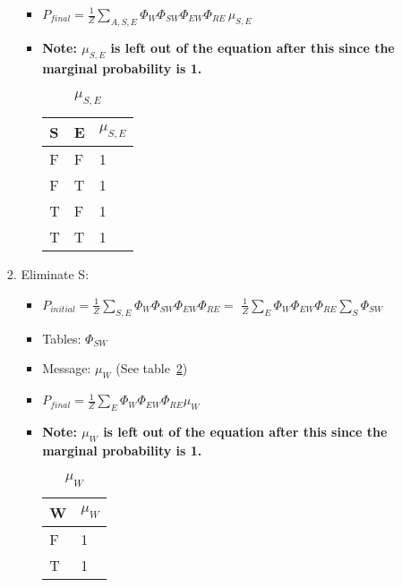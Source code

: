 \documentclass{article}
\begin{document}
\begin{enumerate}[label=(\alph*)]
\begin{enumerate}[label=\roman*.]
\begin{enumerate}[label=\alph*.]
\begin{itemize}
\item $P_{final}=\frac{1}{Z}\sum_{A,S,E}\Phi_{W}\Phi_{SW}\Phi_{EW}\Phi_{RE}\,\mu_{S,E}$ 

\item \textbf{Note:  $\mu_{S,E}$ is left out of the equation after this since the marginal probability is 1.}

\begin{table}[h]
\centering
\caption{$\mu_{S,E}$}
\label{table:tbl1}
\begin{tabular}{|l|l|l|}
\hline
 S & E & $\mu_{S,E}$   \\
\hline \hline
 F & F & 1  \\
 F & T & 1  \\
 T & F & 1  \\
 T & T & 1 \\
\hline
\end{tabular}
\end{table}

\end{itemize}

\item Eliminate S:

\begin{itemize}

\item $P_{initial}=\frac{1}{Z}\sum_{S,E}\Phi_{W}\Phi_{SW}\Phi_{EW}\Phi_{RE}=$
$\frac{1}{Z}\sum_{E}\Phi_{W}\Phi_{EW}\Phi_{RE}\sum_S\Phi_{SW}$ 

\item Tables: $\Phi_{SW}$

\item Message: $\mu_{W}$ (See table~\ref{table:tbl2})

\item $P_{final}=\frac{1}{Z}\sum_{E}\Phi_{W}\Phi_{EW}\Phi_{RE}\mu_W$

\item \textbf{Note:  $\mu_{W}$ is left out of the equation after this since the marginal probability is 1.}

\begin{table}[h]
\centering
\caption{$\mu_{W}$}
\label{table:tbl2}
\begin{tabular}{|l|l|}
\hline
 W & $\mu_{W}$   \\
\hline \hline
 F & 1  \\
 T & 1  \\
\hline
\end{tabular}
\end{table}

\end{itemize}


\end{enumerate}
\end{enumerate}
\end{enumerate}
\end{document}
